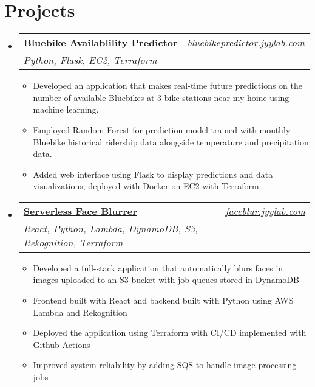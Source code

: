 \documentclass[letterpaper,11pt]{article}
\makeatletter
\newcommand{\resumeItem}[1]{
  \item\small{
    {#1 \vspace{-2pt}}
  }
}
\newcommand{\resumeSubheading}[4]{
  \vspace{-2pt}\item
    \begin{tabular*}{0.97\textwidth}[t]{l@{\extracolsep{\fill}}r}
      \textbf{#1} & #2 \\
      \textit{\small#3} & \textit{\small #4} \\
    \end{tabular*}\vspace{-7pt}
}
\newcommand{\resumeSubHeadingListStart}{\begin{itemize}[leftmargin=0.08in, label={}]}
\newcommand{\resumeSubHeadingListEnd}{\end{itemize}}
\newcommand{\resumeItemListStart}{\begin{itemize}[leftmargin=0.22in]}
\newcommand{\resumeItemListEnd}{\end{itemize}\vspace{-5pt}}
\makeatother
\begin{document}
\section{Projects}
    \resumeSubHeadingListStart
        \resumeSubheading
        {\textbf{{Bluebike Availablility Predictor}}}{\emph{\href{https://bluebikepredictor.jyylab.com}{bluebikepredictor.jyylab.com}}}
        {Python, Flask, EC2, Terraform}{}
        \resumeItemListStart
          \resumeItem{Developed an application that makes real-time future predictions on the number of available Bluebikes at 3 bike stations near my home using machine learning.}
          \resumeItem{Employed Random Forest for prediction model trained with monthly Bluebike historical ridership data alongside temperature and precipitation data.}
          \resumeItem{Added web interface using Flask to display predictions and data visualizations, deployed with Docker on EC2 with Terraform.}
        \resumeItemListEnd

        \resumeSubheading
            {\textbf{\href{https://faceblur.jyylab.com}{Serverless Face Blurrer}}}{\emph{\href{https://faceblur.jyylab.com}{faceblur.jyylab.com}}}
            {React, Python, Lambda, DynamoDB, S3, Rekognition, Terraform}{}
            \resumeItemListStart
                \resumeItem{Developed a full-stack application that automatically blurs faces in images uploaded to an S3 bucket with job queues stored in DynamoDB}
                \resumeItem{Frontend built with React and backend built with Python using AWS Lambda and Rekognition}
                \resumeItem{Deployed the application using Terraform with CI/CD implemented with Github Actions}
                \resumeItem{Improved system reliability by adding SQS to handle image processing jobs}
            \resumeItemListEnd

    \resumeSubHeadingListEnd
\end{document}
